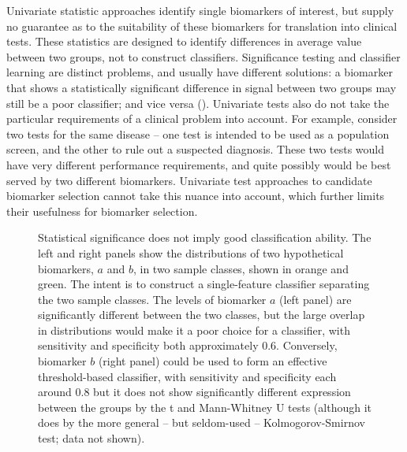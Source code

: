 \documentclass[dissertation.tex]{subfiles}
\begin{document}
Univariate statistic approaches identify single biomarkers of interest, but supply no guarantee as to the suitability of these biomarkers for translation into clinical tests.  These statistics are designed to identify differences in average value between two groups, not to construct classifiers.  Significance testing and classifier learning are distinct problems, and usually have different solutions: a biomarker that shows a statistically significant difference in signal between two groups may still be a poor classifier; and vice versa ().  Univariate tests also do not take the particular requirements of a clinical problem into account.  For example, consider two tests for the same disease -- one test is intended to be used as a population screen, and the other to rule out a suspected diagnosis.  These two tests would have very different performance requirements, and quite possibly would be best served by two different biomarkers.  Univariate test approaches to candidate biomarker selection cannot take this nuance into account, which further limits their usefulness for biomarker selection.

\begin{figure}[!htbp]
  \centering
  \vspace{1cm}
  \hspace{1cm}
  \caption[Statistical significance does not imply good classification ability]{Statistical significance does not imply good classification ability.  The left and right panels show the distributions of two hypothetical biomarkers, $a$ and $b$, in two sample classes, shown in orange and green.  The intent is to construct a single-feature classifier separating the two sample classes.  The levels of biomarker $a$ (left panel) are significantly different between the two classes, but the large overlap in distributions would make it a poor choice for a classifier, with sensitivity and specificity both approximately $0.6$.  Conversely, biomarker $b$ (right panel) could be used to form an effective threshold-based classifier, with sensitivity and specificity each around $0.8$ but it does not show significantly different expression between the groups by the t and Mann-Whitney U tests (although it does by the more general -- but seldom-used -- Kolmogorov-Smirnov test; data not shown).}
\label{fig:messina-example-stats-class}
\end{figure}
\end{document}

